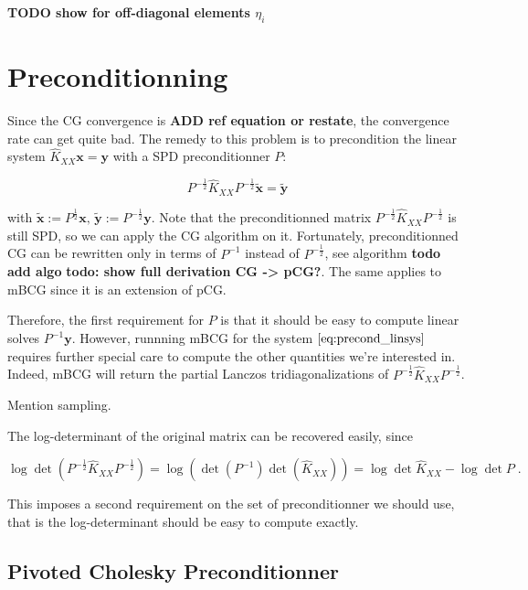 \documentclass{article}
\newcommand{\vect}[1]{\boldsymbol{\mathbf{#1}}}
\begin{document}
\textbf{TODO show for off-diagonal elements $\eta_i$}

\section{Preconditionning}

Since the CG convergence is \textbf{ADD ref equation or restate}, the convergence rate can get quite bad. The remedy to this problem is to precondition the linear system $\widehat K_{XX} \vect x = \vect y$ with a SPD preconditionner $P$:

\begin{equation} \label{eq:precond_linsys}
    P^{-\frac 1 2} \widehat K_{XX} P^{-\frac 1 2} \tilde{\vect x} = \tilde{\vect y} 
\end{equation}

with $\tilde{\vect x} := P^\frac{1}{2} \vect x, \, \tilde{\vect y} := P^{-\frac{1}{2}} \vect y$. Note that the preconditionned matrix $P^{-\frac 1 2} \widehat K_{XX} P^{-\frac 1 2}$ is still SPD, so we can apply the CG algorithm on it. Fortunately, preconditionned CG can be rewritten only in terms of $P^{-1}$ instead of $P^{-\frac 1 2}$, see algorithm \textbf{todo add algo} \textbf{todo: show full derivation CG -> pCG?}. The same applies to mBCG since it is an extension of pCG.

Therefore, the first requirement for $P$ is that it should be easy to compute linear solves $P^{-1} \vect y$. However, runnning mBCG for the system $\eqref{eq:precond_linsys}$ requires further special care to compute the other quantities we're interested in. Indeed, mBCG will return the partial Lanczos tridiagonalizations of $P^{-\frac 1 2} \widehat K_{XX} P^{-\frac 1 2}$. 


Mention sampling.

The log-determinant of the original matrix can be recovered easily, since

\begin{equation*}
    \log\det\left( P^{-\frac 1 2} \widehat K_{XX} P^{-\frac 1 2} \right) = \log\left( \det(P^{-1}) \det(\widehat K_{XX}) \right) = \log\det \widehat K_{XX} - \log\det P \;.
\end{equation*}

This imposes a second requirement on the set of preconditionner we should use, that is the log-determinant should be easy to compute exactly. 

\subsection{Pivoted Cholesky Preconditionner}
\end{document}
